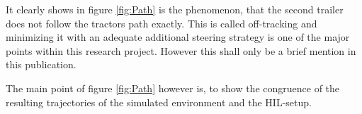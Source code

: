 \documentclass[root.tex]{subfiles}
\begin{document}
	It clearly shows in figure \ref{fig:Path} is the phenomenon, that the second trailer does not follow  the tractors path exactly. This is called off-tracking and minimizing it with an adequate additional steering strategy is one of the major points within this research project. However this shall only be a brief mention in this publication. 
	
	The main point of figure \ref{fig:Path} however is, to show the congruence of the resulting trajectories of the simulated environment and the \gls{HIL}-setup. 
	
	
	
	
		
	

	
\end{document}
